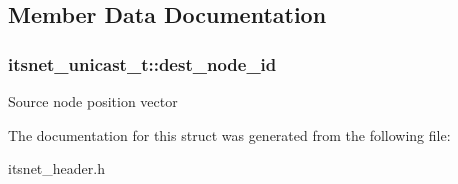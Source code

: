\subsection{\-Member \-Data \-Documentation}
\hypertarget{structitsnet__unicast__t_ab6ac57187ac2010c5b8f86f645f3b8e1}{
\subsubsection[{dest\-\_\-node\-\_\-id}]{ {\bf itsnet\-\_\-unicast\-\_\-t\-::dest\-\_\-node\-\_\-id}}}\label{structitsnet__unicast__t_ab6ac57187ac2010c5b8f86f645f3b8e1}
\-Source node position vector 

\-The documentation for this struct was generated from the following file\-:\begin{DoxyCompactItemize}
\item 
itsnet\-\_\-header.\-h\end{DoxyCompactItemize}
